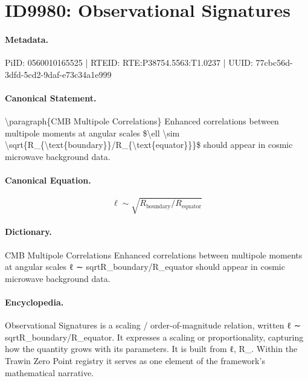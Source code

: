 \section*{ID9980: Observational Signatures}
\paragraph{Metadata.}
PiID: 0560010165525 | RTEID: RTE:P38754.5563:T1.0237 | UUID: 77cbc56d-3dfd-5cd2-9daf-e73c34a1e999

\paragraph{Canonical Statement.}
\textbackslash{}paragraph\{CMB Multipole Correlations\} Enhanced correlations between multipole moments at angular scales \$\textbackslash{}ell \textbackslash{}sim \textbackslash{}sqrt\{R\_\{\textbackslash{}text\{boundary\}\}/R\_\{\textbackslash{}text\{equator\}\}\}\$ should appear in cosmic microwave background data.

\paragraph{Canonical Equation.}
\[
\ell \sim \sqrt{R_{\text{boundary}}/R_{\text{equator}}}
\]

\paragraph{Dictionary.}
CMB Multipole Correlations Enhanced correlations between multipole moments at angular scales ℓ ∼ sqrtR\_boundary/R\_equator should appear in cosmic microwave background data.

\paragraph{Encyclopedia.}
Observational Signatures is a scaling / order-of-magnitude relation, written ℓ ∼ sqrtR\_boundary/R\_equator. It expresses a scaling or proportionality, capturing how the quantity grows with its parameters. It is built from ℓ, R\_. Within the Trawin Zero Point registry it serves as one element of the framework's mathematical narrative.
